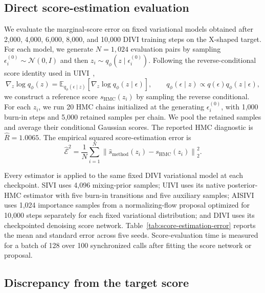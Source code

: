 \subsection{Direct score-estimation evaluation}
\label{app:score-estimation}

We evaluate the marginal-score error on fixed variational models obtained after 2,000, 4,000, 6,000, 8,000, and 10,000 DIVI training steps on the X-shaped target. For each model, we generate $N=1{,}024$ evaluation pairs by sampling $\epsilon_i^{(0)}\sim\mathcal{N}(0,I)$ and then $z_i\sim q_\phi(z\mid\epsilon_i^{(0)})$. Following the reverse-conditional score identity used in UIVI~\citep{titsias2019unbiased},
\begin{equation}
  \nabla_z\log q_\phi(z)
  = \mathbb{E}_{q_\phi(\epsilon\mid z)}
    \left[\nabla_z\log q_\phi(z\mid\epsilon)\right],
  \qquad
  q_\phi(\epsilon\mid z)\propto q(\epsilon)q_\phi(z\mid\epsilon),
\end{equation}
we construct a reference score $s_{\mathrm{HMC}}(z_i)$ by sampling the reverse conditional. For each $z_i$, we run 20 HMC chains initialized at the generating $\epsilon_i^{(0)}$, with 1,000 burn-in steps and 5,000 retained samples per chain. We pool the retained samples and average their conditional Gaussian scores. The reported HMC diagnostic is $\hat{R}=1.0065$. The empirical squared score-estimation error is
\begin{equation}
  \widehat{\mathcal{E}}^2
  = \frac{1}{N}\sum_{i=1}^{N}
    \left\|\widehat{s}_{\mathrm{method}}(z_i)-s_{\mathrm{HMC}}(z_i)\right\|_2^2.
\end{equation}

Every estimator is applied to the same fixed DIVI variational model at each checkpoint. SIVI uses 4,096 mixing-prior samples; UIVI uses its native posterior-HMC estimator with five burn-in transitions and five auxiliary samples; AISIVI uses 1,024 importance samples from a normalizing-flow proposal optimized for 10,000 steps separately for each fixed variational distribution; and DIVI uses its checkpointed denoising score network. Table~\ref{tab:score-estimation-error} reports the mean and standard error across five seeds. Score-evaluation time is measured for a batch of 128 over 100 synchronized calls after fitting the score network or proposal.

\subsection{Discrepancy from the target score}
\label{app:target-score-discrepancy}

